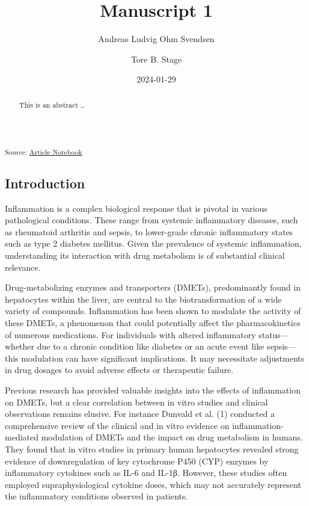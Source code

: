 \documentclass[
  letterpaper,
  DIV=11,
  numbers=noendperiod,
  oneside]{scrartcl}
\title{Manuscript 1}
\author{Andreas Ludvig Ohm Svendsen \and Tore B. Stage}
\date{2024-01-29}
\begin{document}
\maketitle
\begin{abstract}
This is an abstract \ldots{}
\end{abstract}

\textsubscript{Source:
\href{https://andreasludvig.github.io/manuscript_one/index-preview.html}{Article
Notebook}}

\subsection{Introduction}\label{introduction}

Inflammation is a complex biological response that is pivotal in various
pathological conditions. These range from systemic inflammatory
diseases, such as rheumatoid arthritis and sepsis, to lower-grade
chronic inflammatory states such as type 2 diabetes mellitus. Given the
prevalence of systemic inflammation, understanding its interaction with
drug metabolism is of substantial clinical relevance.

Drug-metabolizing enzymes and transporters (DMETs), predominantly found
in hepatocytes within the liver, are central to the biotransformation of
a wide variety of compounds. Inflammation has been shown to modulate the
activity of these DMETs, a phenomenon that could potentially affect the
pharmacokinetics of numerous medications. For individuals with altered
inflammatory status---whether due to a chronic condition like diabetes
or an acute event like sepsis---this modulation can have significant
implications. It may necessitate adjustments in drug dosages to avoid
adverse effects or therapeutic failure.

Previous research has provided valuable insights into the effects of
inflammation on DMETs, but a clear correlation between in vitro studies
and clinical observations remains elusive. For instance Dunvald et al.
(1) conducted a comprehensive review of the clinical and in vitro
evidence on inflammation-mediated modulation of DMETs and the impact on
drug metabolism in humans. They found that in vitro studies in primary
human hepatocytes revealed strong evidence of downregulation of key
cytochrome P450 (CYP) enzymes by inflammatory cytokines such as IL-6 and
IL-1β. However, these studies often employed supraphysiological cytokine
doses, which may not accurately represent the inflammatory conditions
observed in patients.
\end{document}
